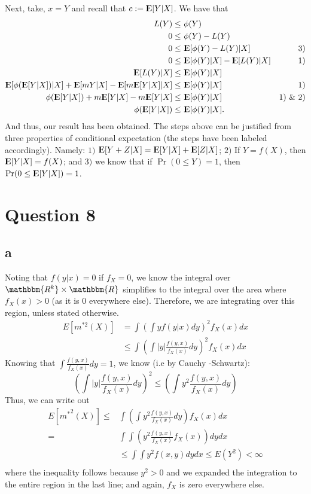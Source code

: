 \documentclass[12pt]{paper}
\newcommand{\Expect}{{\rm I\kern-.3em E}}
\begin{document}
Next, take, $x=Y$ and recall that $c:=\Expect[Y|X]$. We have that
\begin{align*}
L(Y)\leq&~\phi(Y) &\\
0\leq&~\phi(Y)-L(Y) &\\
0\leq&~\Expect[\phi(Y)-L(Y)|X] & 3)\\
0\leq&~\Expect[\phi(Y)|X]-\Expect[L(Y)|X] &1)\\
\Expect[L(Y)|X]\leq&~\Expect[\phi(Y)|X]\\
\Expect[\phi(\Expect[Y|X])|X]+\Expect[mY|X]-\Expect[m\Expect[Y|X]|X]\leq&~\Expect[\phi(Y)|X] &1)\\
\phi(\Expect[Y|X])+m\Expect[Y|X]-m\Expect[Y|X]\leq&~\Expect[\phi(Y)|X] &1) \text{ \& } 2)\\
\phi(\Expect[Y|X])\leq&~\Expect[\phi(Y)|X].
\end{align*}
And thus, our result has been obtained. The steps above can be justified from three properties of conditional expectation (the steps have been labeled accordingly). Namely: $1)$ $\Expect[Y+Z|X]=\Expect[Y|X]+\Expect[Z|X]$; $2)$ If $Y=f(X)$, then $\Expect[Y|X]=f(X)$; and $3)$ we know that if $\Pr(0\leq Y)=1$, then $\Pr(0\leq \Expect[Y|X])=1$. 

\section*{Question 8}

\subsection*{a}
Noting that $f(y|x) = 0$ if $f_X = 0$, we know the integral over $\mathbbm{R^k}\times \mathbbm{R}$ simplifies to the integral over the area where $f_X(x)>0$ (as it is 0 everywhere else). Therefore, we are integrating over this region, unless stated otherwise.
\begin{align*}
    E[m^{*2}(X)] &= \int (\int yf(y|x)dy)^2 f_X(x)dx \\
    & \leq \int (\int |y| \frac{f(y,x)}{f_X(x)}dy)^2 f_X(x)dx
\end{align*}
Knowing that $\int \frac{f(y,x)}{f_X(x)}dy = 1$, we know (i.e by Cauchy -Schwartz):
$$(\int |y| \frac{f(y,x)}{f_X(x)}dy)^2 \leq  (\int y^2 \frac{f(y,x)}{f_X(x)}dy)$$
Thus, we can write out
\begin{align*}
    E[{m^*}^2(X)] \leq & \int (\int y^2 \frac{f(y,x)}{f_X(x)}dy)f_X(x)dx \\
    = & \int \int (y^2 \frac{f(y,x)}{f_X(x)}f_X(x))dy dx \\
    & \leq \int \int y^2 f(x,y) dy dx \leq E(Y^2) < \infty \\
\end{align*}
where the inequality follows because $y^2>0$ and we expanded the integration to the entire region in the last line; and again, $f_X$ is zero everywhere else. 
\end{document}
